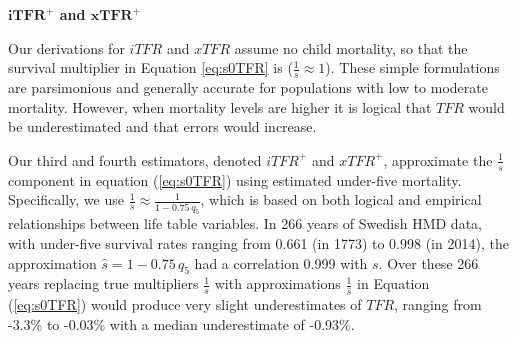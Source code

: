 \documentclass[12pt]{article}
\begin{document}

\textbf{\(\mathbf{iTFR^+}\) and \(\mathbf{xTFR^+}\)}

Our derivations for \(iTFR\) and \(xTFR\) assume no child mortality, so
that the survival multiplier in Equation \ref{eq:s0TFR} is
(\(\frac{1}{s}\approx 1\)). These simple formulations are parsimonious
and generally accurate for populations with low to moderate mortality.
However, when mortality levels are higher it is logical that \(TFR\)
would be underestimated and that errors would increase.

Our third and fourth estimators, denoted \(iTFR^+\) and \(xTFR^+\),
approximate the \(\tfrac{1}{s}\) component in equation (\ref{eq:s0TFR})
using estimated under-five mortality. Specifically, we use
\(\tfrac{1}{s}\approx \tfrac{1}{1-0.75\,q_5}\), which is based on both
logical and empirical relationships between life table variables. In 266
years of Swedish HMD data, with under-five survival rates ranging from
0.661 (in 1773) to 0.998 (in 2014), the approximation
\(\hat{s}=1-0.75\,q_5\) had a correlation 0.999 with \(s\). Over these
266 years replacing true multipliers \(\tfrac{1}{s}\) with
approximations \(\tfrac{1}{\hat{s}}\) in Equation (\ref{eq:s0TFR}) would
produce very slight underestimates of \(TFR\), ranging from -3.3\% to
-0.03\% with a median underestimate of -0.93\%.
\end{document}
